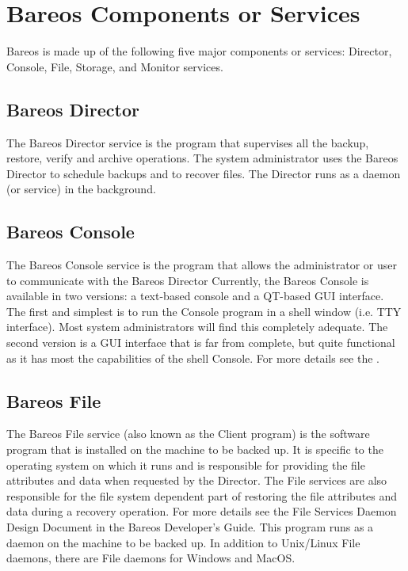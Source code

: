 \section{Bareos Components or Services}

Bareos is made up of the following five major components or services:
Director, Console, File, Storage, and Monitor services.


\subsection*{Bareos Director}
   \label{DirDef}
   The Bareos Director service is the program that supervises
   all the backup, restore, verify and archive operations.  The system
   administrator uses the Bareos Director to schedule backups and to
   recover files. The Director runs as a daemon
   (or service) in the background.
   \label{UADef}

\subsection*{Bareos Console}

   The Bareos Console service is the program that allows the
   administrator or user to communicate with the Bareos Director
   Currently, the Bareos Console is available in two versions:
   a text-based console and a QT-based GUI interface.
   The first and simplest is to run the Console program in a shell window
   (i.e.  TTY interface).  Most system administrators will find this
   completely adequate.  The second version is a GUI interface that
   is far from complete, but quite functional as it has most the
   capabilities of the shell Console. For more
   details see the .

\subsection*{Bareos File}
   \label{FDDef}
   The Bareos File service (also known as the Client program) is the software
   program that is installed on the machine to be backed up.
   It is specific to the
   operating system on which it runs and is responsible for providing the
   file attributes and data when requested by the Director.  The File
   services are also responsible for the file system dependent part of
   restoring the file attributes and data during a recovery operation.  For
   more details see the File Services Daemon Design Document in the Bareos
   Developer's Guide.  This program runs as a daemon on the machine to be
   backed up.
   In addition to Unix/Linux File daemons, there are File daemons for Windows and MacOS.

